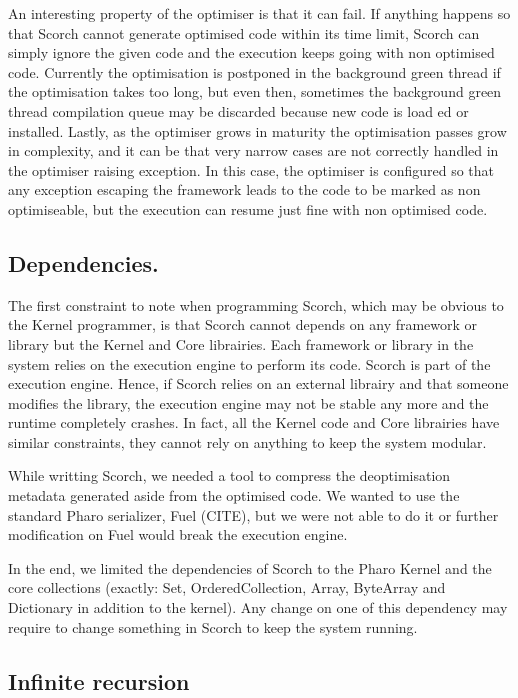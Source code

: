 \documentclass[a4paper,12pt,twoside]{../includes/ThesisStyle}
\begin{document}
An interesting property of the optimiser is that it can fail. If anything happens so that Scorch cannot generate optimised code within its time limit, Scorch can simply ignore the given code and the execution keeps going with non optimised code. Currently the optimisation is postponed in the background green thread if the optimisation takes too long, but even then, sometimes the background green thread compilation queue may be discarded because new code is load ed or installed. Lastly, as the optimiser grows in maturity the optimisation passes grow in complexity, and it can be that very narrow cases are not correctly handled in the optimiser raising exception. In this case, the optimiser is configured so that any exception escaping the framework leads to the code to be marked as non optimiseable, but the execution can resume just fine with non optimised code.

\subsection{Dependencies.} 

The first constraint to note when programming Scorch, which may be obvious to the Kernel programmer, is that Scorch cannot depends on any framework or library but the Kernel and Core librairies. Each framework or library in the system relies on the execution engine to perform its code. Scorch is part of the execution engine. Hence, if Scorch relies on an external librairy and that someone modifies the library, the execution engine may not be stable any more and the runtime completely crashes. In fact, all the Kernel code and Core librairies have similar constraints, they cannot rely on anything to keep the system modular. 

While writting Scorch, we needed a tool to compress the deoptimisation metadata generated aside from the optimised code. We wanted to use the standard Pharo serializer, Fuel (CITE), but we were not able to do it or further modification on Fuel would break the execution engine.

In the end, we limited the dependencies of Scorch to the Pharo Kernel and the core collections (exactly: Set, OrderedCollection, Array, ByteArray and Dictionary in addition to the kernel). Any change on one of this dependency may require to change something in Scorch to keep the system running.

\subsection{Infinite recursion}
\end{document}
